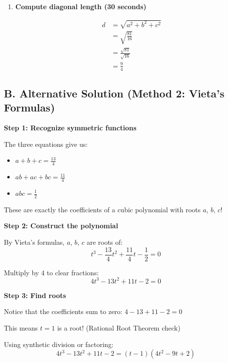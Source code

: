 \documentclass[12pt]{article}
\begin{document}
\begin{solutionbox}
\begin{enumerate}[leftmargin=*]
    \begin{align*}
        a^2 + b^2 + c^2 &= \left(\frac{13}{4}\right)^2 - 2\left(\frac{11}{4}\right)\\
        &= \frac{169}{16} - \frac{22}{4}\\
        &= \frac{169}{16} - \frac{88}{16}\\
        &= \frac{81}{16}
    \end{align*}
    
    \item \textbf{Compute diagonal length (30 seconds)}
    
    \begin{align*}
        d &= \sqrt{a^2 + b^2 + c^2}\\
        &= \sqrt{\frac{81}{16}}\\
        &= \frac{\sqrt{81}}{\sqrt{16}}\\
        &= \frac{9}{4}
    \end{align*}
\end{enumerate}

\subsection*{B. Alternative Solution (Method 2: Vieta's Formulas)}

\textbf{Step 1: Recognize symmetric functions}

The three equations give us:
\begin{itemize}
    \item $a+b+c = \frac{13}{4}$
    \item $ab+ac+bc = \frac{11}{4}$
    \item $abc = \frac{1}{2}$
\end{itemize}

These are exactly the coefficients of a cubic polynomial with roots $a$, $b$, $c$!

\textbf{Step 2: Construct the polynomial}

By Vieta's formulas, $a$, $b$, $c$ are roots of:
$$t^3 - \frac{13}{4}t^2 + \frac{11}{4}t - \frac{1}{2} = 0$$

Multiply by 4 to clear fractions:
$$4t^3 - 13t^2 + 11t - 2 = 0$$

\textbf{Step 3: Find roots}

Notice that the coefficients sum to zero: $4 - 13 + 11 - 2 = 0$

This means $t = 1$ is a root! (Rational Root Theorem check)

Using synthetic division or factoring:
$$4t^3 - 13t^2 + 11t - 2 = (t-1)(4t^2-9t+2)$$


\end{solutionbox}
\end{document}
